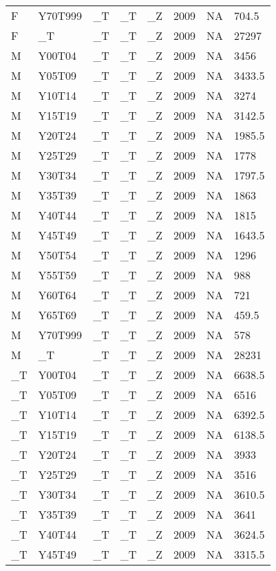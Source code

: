 \begin{longtable}[t]{llllllll}
\addlinespace
F & Y70T999 & \_T & \_T & \_Z & 2009 & NA & 704.5\\
F & \_T & \_T & \_T & \_Z & 2009 & NA & 27297\\
M & Y00T04 & \_T & \_T & \_Z & 2009 & NA & 3456\\
M & Y05T09 & \_T & \_T & \_Z & 2009 & NA & 3433.5\\
M & Y10T14 & \_T & \_T & \_Z & 2009 & NA & 3274\\
\addlinespace
M & Y15T19 & \_T & \_T & \_Z & 2009 & NA & 3142.5\\
M & Y20T24 & \_T & \_T & \_Z & 2009 & NA & 1985.5\\
M & Y25T29 & \_T & \_T & \_Z & 2009 & NA & 1778\\
M & Y30T34 & \_T & \_T & \_Z & 2009 & NA & 1797.5\\
M & Y35T39 & \_T & \_T & \_Z & 2009 & NA & 1863\\
\addlinespace
M & Y40T44 & \_T & \_T & \_Z & 2009 & NA & 1815\\
M & Y45T49 & \_T & \_T & \_Z & 2009 & NA & 1643.5\\
M & Y50T54 & \_T & \_T & \_Z & 2009 & NA & 1296\\
M & Y55T59 & \_T & \_T & \_Z & 2009 & NA & 988\\
M & Y60T64 & \_T & \_T & \_Z & 2009 & NA & 721\\
\addlinespace
M & Y65T69 & \_T & \_T & \_Z & 2009 & NA & 459.5\\
M & Y70T999 & \_T & \_T & \_Z & 2009 & NA & 578\\
M & \_T & \_T & \_T & \_Z & 2009 & NA & 28231\\
\_T & Y00T04 & \_T & \_T & \_Z & 2009 & NA & 6638.5\\
\_T & Y05T09 & \_T & \_T & \_Z & 2009 & NA & 6516\\
\addlinespace
\_T & Y10T14 & \_T & \_T & \_Z & 2009 & NA & 6392.5\\
\_T & Y15T19 & \_T & \_T & \_Z & 2009 & NA & 6138.5\\
\_T & Y20T24 & \_T & \_T & \_Z & 2009 & NA & 3933\\
\_T & Y25T29 & \_T & \_T & \_Z & 2009 & NA & 3516\\
\_T & Y30T34 & \_T & \_T & \_Z & 2009 & NA & 3610.5\\
\addlinespace
\_T & Y35T39 & \_T & \_T & \_Z & 2009 & NA & 3641\\
\_T & Y40T44 & \_T & \_T & \_Z & 2009 & NA & 3624.5\\
\_T & Y45T49 & \_T & \_T & \_Z & 2009 & NA & 3315.5\\

\end{longtable}
